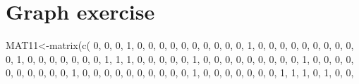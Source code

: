 \documentclass[
  notitlepage,
  onecolumn,
  openany]{book}
\newenvironment{Shaded}{\begin{snugshade}}{\end{snugshade}}
\newcommand{\DecValTok}[1]{\textcolor[rgb]{0.00,0.00,0.81}{#1}}
\newcommand{\FunctionTok}[1]{\textcolor[rgb]{0.00,0.00,0.00}{#1}}
\newcommand{\NormalTok}[1]{#1}
\newcommand{\OtherTok}[1]{\textcolor[rgb]{0.56,0.35,0.01}{#1}}
\begin{document}
\hypertarget{graph-exercise}{%
\section{Graph exercise}\label{graph-exercise}}

\begin{Shaded}
\begin{Highlighting}[]
\NormalTok{MAT11}\OtherTok{\textless{}{-}}\FunctionTok{matrix}\NormalTok{(}\FunctionTok{c}\NormalTok{(}
\DecValTok{0}\NormalTok{, }\DecValTok{0}\NormalTok{, }\DecValTok{0}\NormalTok{, }\DecValTok{1}\NormalTok{, }\DecValTok{0}\NormalTok{, }\DecValTok{0}\NormalTok{, }\DecValTok{0}\NormalTok{, }\DecValTok{0}\NormalTok{, }\DecValTok{0}\NormalTok{, }\DecValTok{0}\NormalTok{, }\DecValTok{0}\NormalTok{,}
\DecValTok{0}\NormalTok{, }\DecValTok{0}\NormalTok{, }\DecValTok{0}\NormalTok{, }\DecValTok{1}\NormalTok{, }\DecValTok{0}\NormalTok{, }\DecValTok{0}\NormalTok{, }\DecValTok{0}\NormalTok{, }\DecValTok{0}\NormalTok{, }\DecValTok{0}\NormalTok{, }\DecValTok{0}\NormalTok{, }\DecValTok{0}\NormalTok{,}
\DecValTok{0}\NormalTok{, }\DecValTok{0}\NormalTok{, }\DecValTok{0}\NormalTok{, }\DecValTok{1}\NormalTok{, }\DecValTok{0}\NormalTok{, }\DecValTok{0}\NormalTok{, }\DecValTok{0}\NormalTok{, }\DecValTok{0}\NormalTok{, }\DecValTok{0}\NormalTok{, }\DecValTok{0}\NormalTok{, }\DecValTok{0}\NormalTok{,}
\DecValTok{1}\NormalTok{, }\DecValTok{1}\NormalTok{, }\DecValTok{1}\NormalTok{, }\DecValTok{0}\NormalTok{, }\DecValTok{0}\NormalTok{, }\DecValTok{0}\NormalTok{, }\DecValTok{0}\NormalTok{, }\DecValTok{0}\NormalTok{, }\DecValTok{1}\NormalTok{, }\DecValTok{0}\NormalTok{, }\DecValTok{0}\NormalTok{,}
\DecValTok{0}\NormalTok{, }\DecValTok{0}\NormalTok{, }\DecValTok{0}\NormalTok{, }\DecValTok{0}\NormalTok{, }\DecValTok{0}\NormalTok{, }\DecValTok{0}\NormalTok{, }\DecValTok{0}\NormalTok{, }\DecValTok{1}\NormalTok{, }\DecValTok{0}\NormalTok{, }\DecValTok{0}\NormalTok{, }\DecValTok{0}\NormalTok{,}
\DecValTok{0}\NormalTok{, }\DecValTok{0}\NormalTok{, }\DecValTok{0}\NormalTok{, }\DecValTok{0}\NormalTok{, }\DecValTok{0}\NormalTok{, }\DecValTok{0}\NormalTok{, }\DecValTok{0}\NormalTok{, }\DecValTok{1}\NormalTok{, }\DecValTok{0}\NormalTok{, }\DecValTok{0}\NormalTok{, }\DecValTok{0}\NormalTok{,}
\DecValTok{0}\NormalTok{, }\DecValTok{0}\NormalTok{, }\DecValTok{0}\NormalTok{, }\DecValTok{0}\NormalTok{, }\DecValTok{0}\NormalTok{, }\DecValTok{0}\NormalTok{, }\DecValTok{0}\NormalTok{, }\DecValTok{1}\NormalTok{, }\DecValTok{0}\NormalTok{, }\DecValTok{0}\NormalTok{, }\DecValTok{0}\NormalTok{,}
\DecValTok{0}\NormalTok{, }\DecValTok{0}\NormalTok{, }\DecValTok{0}\NormalTok{, }\DecValTok{0}\NormalTok{, }\DecValTok{1}\NormalTok{, }\DecValTok{1}\NormalTok{, }\DecValTok{1}\NormalTok{, }\DecValTok{0}\NormalTok{, }\DecValTok{1}\NormalTok{, }\DecValTok{0}\NormalTok{, }\DecValTok{0}\NormalTok{,}

\end{Highlighting}
\end{Shaded}
\end{document}
